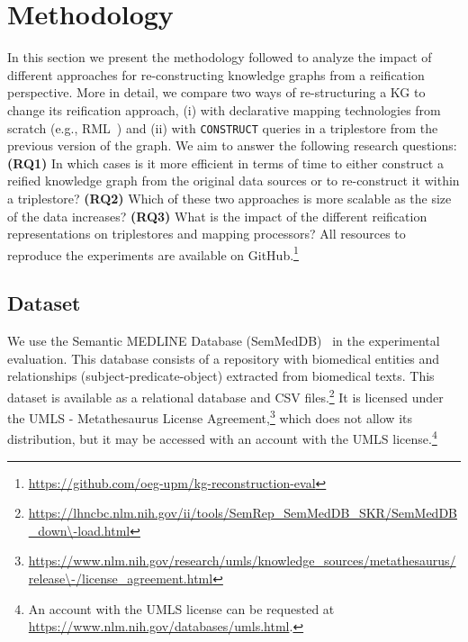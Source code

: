 \section{Methodology}
\label{sec:chp6-1_methodology}

In this section we present the methodology followed to analyze the impact of different approaches for re-constructing knowledge graphs from a reification perspective. More in detail, we compare two ways of re-structuring a KG to change its reification approach, (i) with declarative mapping technologies from scratch (e.g., RML~\citep{Dimou2014rml,iglesias2023rml}) and (ii) with \texttt{CONSTRUCT} queries in a triplestore from the previous version of the graph. We aim to answer the following research questions: 
\textbf{(RQ1)} In which cases is it more efficient in terms of time to either construct a reified knowledge graph from the original data sources or to re-construct it within a triplestore?
\textbf{(RQ2)} Which of these two approaches is more scalable as the size of the data increases?
\textbf{(RQ3)} What is the impact of the different reification representations on triplestores and mapping processors?
All resources to reproduce the experiments are available on GitHub.\footnote{\url{https://github.com/oeg-upm/kg-reconstruction-eval}}



\subsection{Dataset}
\label{sec:chp6-1_dataset}


We use the Semantic MEDLINE Database (SemMedDB)~\citep{SemMedDB} in the experimental evaluation. This database consists of a repository with biomedical entities and relationships (subject-predicate-object) extracted from biomedical texts.
This dataset is available as a relational database and CSV files.\footnote{\url{https://lhncbc.nlm.nih.gov/ii/tools/SemRep\_SemMedDB\_SKR/SemMedDB\_down\-load.html}}
It is licensed under the UMLS - Metathesaurus License Agreement,\footnote{\url{https://www.nlm.nih.gov/research/umls/knowledge\_sources/metathesaurus/release\-/license\_agreement.html}} which does not allow its distribution, but it may be accessed with an account with the UMLS license.\footnote{An account with the UMLS license can be requested at \url{https://www.nlm.nih.gov/databases/umls.html}.}


